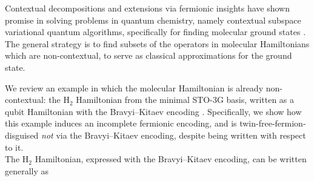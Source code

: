 \documentclass[%
 aip,
 amsmath,amssymb,
 reprint,%
]{revtex4-1}
\begin{document}
\indent Contextual decompositions and extensions via fermionic insights have shown promise in solving problems in quantum chemistry, namely contextual subspace variational quantum algorithms, specifically for finding molecular ground states \cite{Kirby_ContextVQE, Ralli_ContextVQE, Weaving_ContextVQE}. The general strategy is to find subsets of the operators in molecular Hamiltonians which are non-contextual, to serve as classical approximations for the ground state. 

We review an example in which the molecular Hamiltonian is already non-contextual: the H$_2$ Hamiltonian from the minimal STO-3G basis, %
written as a qubit Hamiltonian with the Bravyi--Kitaev encoding \cite{Hempel_2018}. Specifically, we show how this example induces an incomplete fermionic encoding, and is twin-free-fermion-disguised {\it not} via the Bravyi--Kitaev encoding, despite being written with respect to it. \\ 
\indent The H$_2$ Hamiltonian, expressed with the Bravyi--Kitaev encoding, can be written generally as 
\end{document}
